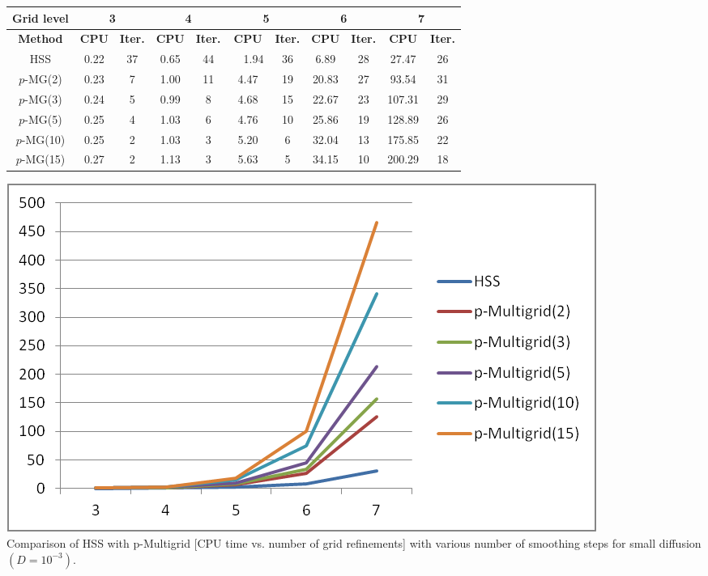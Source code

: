 \documentclass[mathserif]{beamer}
\begin{document}
\begin{frame}
\begin{minipage}{.45\textwidth}
\small
\begin{table}[h!]
\setlength{\tabcolsep}{2.5pt}
\begin{tabular}{|c|c|c|c|c|c|c|c|c|c|c|}
\hline
\textbf{Grid level} & \multicolumn{2}{c|}{\textbf{3}} & \multicolumn{2}{c|}{\textbf{4}} 
& \multicolumn{2}{c|}{\textbf{5}} & \multicolumn{2}{c|}{\textbf{6}} & \multicolumn{2}{c|}{\textbf{7}} \\ 
\hline
\textbf{Method} & {\textbf{CPU}} & {\textbf{Iter.}} & {\textbf{CPU}}
& {\textbf{Iter.}} & {\textbf{CPU}} & {\textbf{Iter.}}
& {\textbf{CPU}} & {\textbf{Iter.}} & {\textbf{CPU}} & {\textbf{Iter.}} \\ 
\hline
HSS        & 0.22 & 37 & 0.65 & 44 & \ \ 1.94 & 36 &  6.89 & 28 &  27.47 & 26 \\ \hline
$p$-MG(2)  & 0.23 &  7 & 1.00 & 11 & 4.47 & 19 & 20.83 & 27 &  93.54 & 31 \\ \hline
$p$-MG(3)  & 0.24 &  5 & 0.99 &  8 & 4.68 & 15 & 22.67 & 23 & 107.31 & 29 \\ \hline
$p$-MG(5)  & 0.25 &  4 & 1.03 &  6 & 4.76 & 10 & 25.86 & 19 & 128.89 & 26 \\ \hline
$p$-MG(10) & 0.25 &  2 & 1.03 &  3 & 5.20 &  6 & 32.04 & 13 & 175.85 & 22 \\ \hline
$p$-MG(15) & 0.27 &  2 & 1.13 &  3 & 5.63 &  5 & 34.15 & 10 & 200.29 & 18 \\ \hline
\end{tabular}
\label{CC-comp-D=0.001}
\end{table}
\normalsize
\end{minipage}
\begin{minipage}{.4\textwidth}
\hspace{15mm}
\begin{minipage}{.95\textwidth}
\includegraphics[width=\textwidth]{resultGraphs/circularConvection/comparison1e-1.png}\ \\
{\small {Comparison of HSS with p-Multigrid [CPU time vs. number of grid refinements] with various number of smoothing steps for small diffusion $(D = 10^{-3})$.}} 
\end{minipage}
\end{minipage}
\end{frame}
\end{document}
